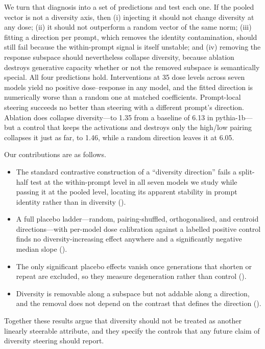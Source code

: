 We turn that diagnosis into a set of predictions and test each one. If the pooled vector is not a
diversity axis, then (i) injecting it should not change diversity at any dose; (ii) it should not
outperform a random vector of the same norm; (iii) fitting a direction per prompt, which removes
the identity contamination, should still fail because the within-prompt signal is itself unstable;
and (iv) removing the response subspace should nevertheless collapse diversity, because ablation
destroys generative capacity whether or not the removed subspace is semantically special. All four
predictions hold. Interventions at 35 dose levels across seven models yield no positive
dose--response in any model, and the fitted direction is numerically worse than a random one at
matched coefficients. Prompt-local steering succeeds no better than steering with a different
prompt's direction. Ablation does collapse diversity---to 1.35 \vendi{} from a baseline of 6.13 in
pythia-1b---but a control that keeps the activations and destroys only the high/low pairing
collapses it just as far, to 1.46, while a random direction leaves it at 6.05.

Our contributions are as follows.
\begin{itemize}
\item The standard contrastive construction of a ``diversity direction'' fails a split-half test at
the within-prompt level in all seven models we study while passing it at the pooled level, locating
its apparent stability in prompt identity rather than in diversity ().
\item A full placebo ladder---random, pairing-shuffled, orthogonalised, and centroid
directions---with per-model dose calibration against a labelled positive control finds no
diversity-increasing effect anywhere and a significantly negative median slope
().
\item The only significant placebo effects vanish once generations that shorten or repeat are
excluded, so they measure degeneration rather than control ().
\item Diversity is removable along a subspace but not addable along a direction, and the removal
does not depend on the contrast that defines the direction ().
\end{itemize}
Together these results argue that diversity should not be treated as another linearly steerable
attribute, and they specify the controls that any future claim of diversity steering should report.
